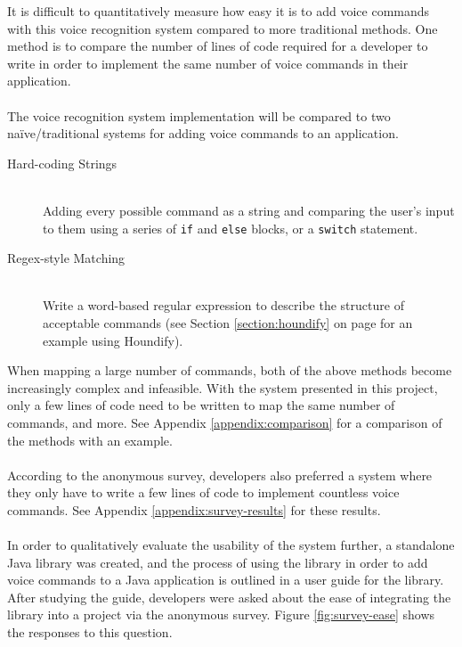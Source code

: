 \documentclass[11pt]{article}
\begin{document}
It is difficult to quantitatively measure how easy it is to add voice commands with this voice recognition system compared to more traditional methods. One method is to compare the number of lines of code required for a developer to write in order to implement the same number of voice commands in their application.
\\
\\
The voice recognition system implementation will be compared to two na\"ive/traditional systems for adding voice commands to an application.

\begin{description}
\item[Hard-coding Strings] \hfill \\ Adding every possible command as a string and comparing the user's input to them using a series of \texttt{if} and \texttt{else} blocks, or a \texttt{switch} statement.
\item[Regex-style Matching] \hfill \\ Write a word-based regular expression to describe the structure of acceptable commands (see Section \ref{section:houndify} on page \pageref{section:houndify} for an example using Houndify).
\end{description}

When mapping a large number of commands, both of the above methods become increasingly complex and infeasible. With the system presented in this project, only a few lines of code need to be written to map the same number of commands, and more. See Appendix \ref{appendix:comparison} for a comparison of the methods with an example.
\\
\\
According to the anonymous survey, developers also preferred a system where they only have to write a few lines of code to implement countless voice commands. See Appendix \ref{appendix:survey-results} for these results.
\\
\\
In order to qualitatively evaluate the usability of the system further, a standalone Java library was created, and the process of using the library in order to add voice commands to a Java application is outlined in a user guide for the library. After studying the guide, developers were asked about the ease of integrating the library into a project via the anonymous survey. Figure \ref{fig:survey-ease} shows the responses to this question.
\end{document}
